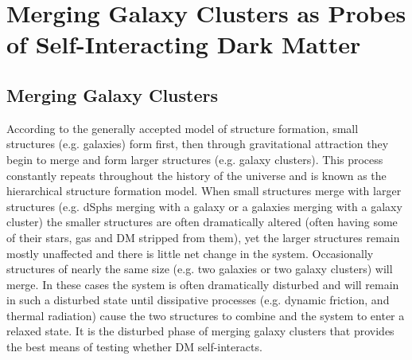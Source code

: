 \section{Merging Galaxy Clusters as Probes of Self-Interacting Dark Matter}\label{section:MergingClustersSIDMprobe}

\subsection{Merging Galaxy Clusters}\label{Section:MergingClusters}

According to the generally accepted model of structure formation, small structures (e.g. galaxies) form first, then through gravitational attraction they begin to merge and form larger structures (e.g. galaxy clusters).
This process constantly repeats throughout the history of the universe and is known as the hierarchical structure formation model.
When small structures merge with larger structures (e.g. dSphs merging with a galaxy or a galaxies merging with a galaxy cluster) the smaller structures are often dramatically altered (often having some of their stars, gas and DM stripped from them), yet the larger structures remain mostly unaffected and there is little net change in the system.
Occasionally structures of nearly the same size (e.g. two galaxies or two galaxy clusters) will merge.
In these cases the system is often dramatically disturbed and will remain in such a disturbed state until dissipative processes (e.g. dynamic friction, and thermal radiation) cause the two structures to combine and the system to enter a relaxed state.
It is the disturbed phase of merging galaxy clusters that provides the best means of testing whether DM self-interacts.

